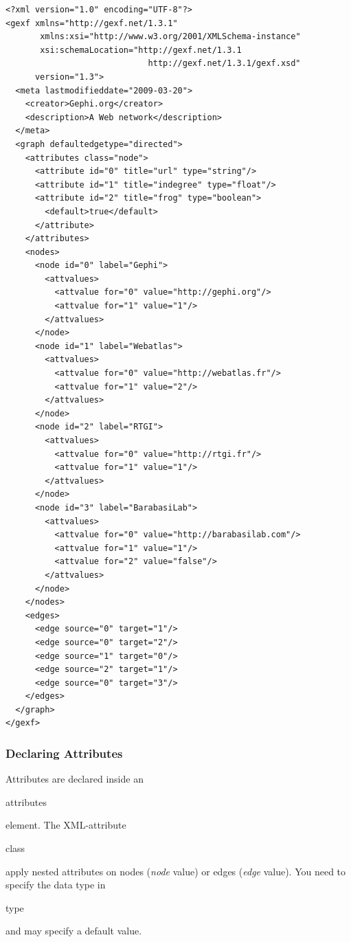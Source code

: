 \documentclass[a4paper,10pt]{article}
\begin{document}
\lstset{ style=gexf }
\begin{lstlisting}[caption={A (small) Web Graph},label=webgraph]
<?xml version="1.0" encoding="UTF-8"?>
<gexf xmlns="http://gexf.net/1.3.1"
       xmlns:xsi="http://www.w3.org/2001/XMLSchema-instance"
       xsi:schemaLocation="http://gexf.net/1.3.1
                             http://gexf.net/1.3.1/gexf.xsd"
      version="1.3">
  <meta lastmodifieddate="2009-03-20">
    <creator>Gephi.org</creator>
    <description>A Web network</description>
  </meta>
  <graph defaultedgetype="directed">
    <attributes class="node">
      <attribute id="0" title="url" type="string"/>
      <attribute id="1" title="indegree" type="float"/>
      <attribute id="2" title="frog" type="boolean">
        <default>true</default>
      </attribute>
    </attributes>
    <nodes>
      <node id="0" label="Gephi">
        <attvalues>
          <attvalue for="0" value="http://gephi.org"/>
          <attvalue for="1" value="1"/>
        </attvalues>
      </node>
      <node id="1" label="Webatlas">
        <attvalues>
          <attvalue for="0" value="http://webatlas.fr"/>
          <attvalue for="1" value="2"/>
        </attvalues>
      </node>
      <node id="2" label="RTGI">
        <attvalues>
          <attvalue for="0" value="http://rtgi.fr"/>
          <attvalue for="1" value="1"/>
        </attvalues>
      </node>
      <node id="3" label="BarabasiLab">
        <attvalues>
          <attvalue for="0" value="http://barabasilab.com"/>
          <attvalue for="1" value="1"/>
          <attvalue for="2" value="false"/>
        </attvalues>
      </node>
    </nodes>
    <edges>
      <edge source="0" target="1"/>
      <edge source="0" target="2"/>
      <edge source="1" target="0"/>
      <edge source="2" target="1"/>
      <edge source="0" target="3"/>
    </edges>
  </graph>
</gexf>
\end{lstlisting}


\subsubsection{Declaring Attributes}

Attributes are declared inside an \begin{footnotesize}attributes\end{footnotesize} element. The XML-attribute \begin{footnotesize}class\end{footnotesize} apply nested attributes on nodes (\textit{node} value) or edges (\textit{edge} value). You need to specify the data type in \begin{footnotesize}type\end{footnotesize} and may specify a default value.
\end{document}

